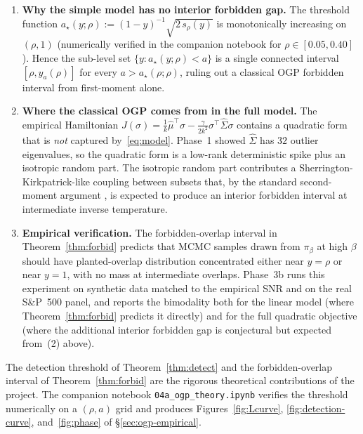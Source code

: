 \begin{enumerate}
\item \textbf{Why the simple model has no interior forbidden gap.} The threshold function
$a_\star(y;\rho) := (1-y)^{-1}\sqrt{2\, s_\rho(y)}$ is monotonically increasing on $(\rho,1)$
(numerically verified in the companion notebook for $\rho\in[0.05, 0.40]$). Hence the
sub-level set $\{y : a_\star(y;\rho)<a\}$ is a single connected interval $[\rho, y_a(\rho)]$
for every $a>a_\star(\rho;\rho)$, ruling out a classical OGP forbidden interval from
first-moment alone.

\item \textbf{Where the classical OGP comes from in the full model.} The empirical
Hamiltonian $J(\sigma) = \tfrac{1}{k}\hat\mu^\top\sigma - \tfrac{\gamma}{2k^2}\sigma^\top
\hat\Sigma\sigma$ contains a quadratic form that is \emph{not} captured
by~\eqref{eq:model}. Phase~1 showed $\hat\Sigma$ has $32$ outlier eigenvalues, so the
quadratic form is a low-rank deterministic spike plus an isotropic random part. The
isotropic random part contributes a Sherrington-Kirkpatrick-like coupling between subsets
that, by the standard second-moment argument
\cite{sherrington-kirkpatrick,gamarnik-pnas}, is expected to produce an
interior forbidden interval at intermediate inverse temperature.

\item \textbf{Empirical verification.} The forbidden-overlap interval in
Theorem~\ref{thm:forbid} predicts that MCMC samples drawn from $\pi_\beta$ at high $\beta$
should have planted-overlap distribution concentrated either near $y=\rho$ or near $y=1$,
with no mass at intermediate overlaps. Phase~3b runs this experiment on synthetic data
matched to the empirical SNR and on the real S\&P~500 panel, and reports the bimodality
both for the linear model (where Theorem~\ref{thm:forbid} predicts it directly) and for
the full quadratic objective (where the additional interior forbidden gap is conjectural
but expected from~(2) above).
\end{enumerate}

The detection threshold of Theorem~\ref{thm:detect} and the forbidden-overlap interval
of Theorem~\ref{thm:forbid} are the rigorous theoretical contributions of the project.
The companion notebook \texttt{04a\_ogp\_theory.ipynb} verifies the threshold numerically
on a $(\rho, a)$ grid and produces Figures~\ref{fig:Lcurve},
\ref{fig:detection-curve}, and~\ref{fig:phase} of \S\ref{sec:ogp-empirical}.
